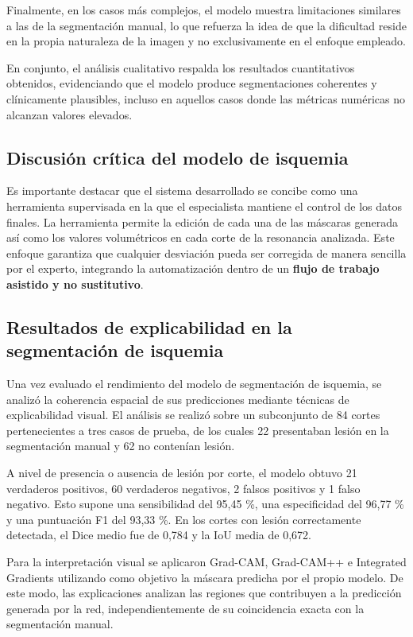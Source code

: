 Finalmente, en los casos más complejos, el modelo muestra limitaciones similares a las de la segmentación manual, lo que refuerza la idea de que la dificultad reside en la propia naturaleza de la imagen y no exclusivamente en el enfoque empleado.

En conjunto, el análisis cualitativo respalda los resultados cuantitativos obtenidos, evidenciando que el modelo produce segmentaciones coherentes y clínicamente plausibles, incluso en aquellos casos donde las métricas numéricas no alcanzan valores elevados.

\subsection{Discusión crítica del modelo de isquemia}

Es importante destacar que el sistema desarrollado se concibe como una herramienta supervisada en la que el especialista mantiene el control de los datos finales. La herramienta permite la edición de cada una de las máscaras generada así como los valores volumétricos en cada corte de la resonancia analizada. Este enfoque garantiza que cualquier desviación pueda ser corregida de manera sencilla por el experto, integrando la automatización dentro de un \textbf{flujo de trabajo asistido y no sustitutivo}.

\subsection{Resultados de explicabilidad en la segmentación de isquemia}

Una vez evaluado el rendimiento del modelo de segmentación de isquemia, se analizó la coherencia espacial de sus predicciones mediante técnicas de explicabilidad visual. El análisis se realizó sobre un subconjunto de 84 cortes pertenecientes a tres casos de prueba, de los cuales 22 presentaban lesión en la segmentación manual y 62 no contenían lesión.

A nivel de presencia o ausencia de lesión por corte, el modelo obtuvo 21 verdaderos positivos, 60 verdaderos negativos, 2 falsos positivos y 1 falso negativo. Esto supone una sensibilidad del 95,45 \%, una especificidad del 96,77 \% y una puntuación F1 del 93,33 \%. En los cortes con lesión correctamente detectada, el Dice medio fue de 0,784 y la IoU media de 0,672.

Para la interpretación visual se aplicaron Grad-CAM, Grad-CAM++ e Integrated Gradients utilizando como objetivo la máscara predicha por el propio modelo. De este modo, las explicaciones analizan las regiones que contribuyen a la predicción generada por la red, independientemente de su coincidencia exacta con la segmentación manual.

